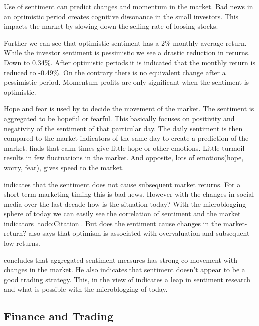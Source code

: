 Use of sentiment can predict changes and momentum in the market.
Bad news in an optimistic period creates cognitive dissonance in the small
investors. This impacts the market by slowing down the selling rate of loosing
stocks. \cite[p29]{doukas10:sentiment_and_momentum}

Further we can see that optimistic sentiment has a 2\% monthly average return.
While the investor sentiment is pessimistic we see a drastic reduction in
returns. Down to 0.34\%.\cite[p5]{doukas10:sentiment_and_momentum}
After optimistic periods it is indicated that the monthly return is reduced to
-0.49\%. On the contrary there is no equivalent change after a pessimistic
period. \cite[p6-7]{doukas10:sentiment_and_momentum}
Momentum profits are only significant when the sentiment is optimistic.
\cite[p29]{doukas10:sentiment_and_momentum}

Hope and fear is used by \cite[]{Zhang201155} to decide the movement of the
market. The sentiment is aggregated to be hopeful or fearful. This basically
focuses on positivity and negativity of the sentiment of that particular day.
The daily sentiment is then compared to the market indicators of the same day
to create a prediction of the market. \cite[]{Zhang201155} finds that calm
times give little hope or other emotions. Little turmoil results in few
fluctuations in the market. And opposite, lots of emotions(hope, worry, fear),
gives speed to the market.

\cite[p3]{Brown20041} indicates that the sentiment does not cause subsequent
market returns. For a short-term marketing timing this is bad news. However
with the changes in social media over the last decade how is the situation
today? With the microblogging sphere of today we can easily see the
correlation of sentiment and the market indicators [todo:Citation]. But
does the sentiment cause changes in the market-return?
\cite[p3]{Brown20041} also says that optimism is associated with overvaluation
and subsequent low returns.

\cite[p]{Brown20041} concludes that aggregated sentiment measures has strong
co-movement with changes in the market. He also indicates that sentiment
doesn't appear to be a good trading strategy. This, in the view of
\cite[]{Zhang201155} indicates a leap in sentiment research and what is possible
with the microblogging of today.

\subsection{Finance and Trading}

